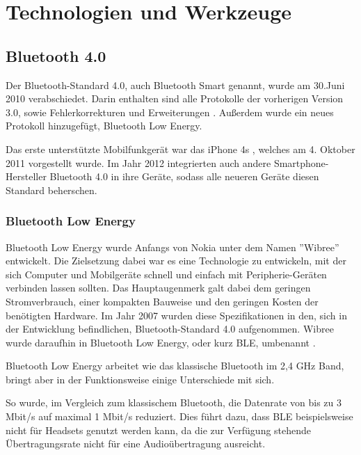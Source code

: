 \chapter{Technologien und Werkzeuge}
\label{chap:technologies}

\section{Bluetooth 4.0}
\label{sec:technologies:bluetooth4}

Der Bluetooth-Standard 4.0, auch Bluetooth Smart genannt, wurde am 30.Juni 2010 verabschiedet. Darin enthalten sind alle Protokolle der vorherigen Version 3.0, sowie Fehlerkorrekturen und Erweiterungen \cite{bluetoothcore}. Außerdem wurde ein neues Protokoll hinzugefügt, Bluetooth Low Energy. 

Das erste unterstützte Mobilfunkgerät war das iPhone 4s \cite{iphone4sspecs}, welches am 4. Oktober 2011 vorgestellt wurde. Im Jahr 2012 integrierten auch andere Smartphone-Hersteller Bluetooth 4.0 in ihre Geräte, sodass alle neueren Geräte diesen Standard beherschen.


\subsection{Bluetooth Low Energy}
\label{sec:technologies:bluetoothLE}

Bluetooth Low Energy wurde Anfangs von Nokia unter dem Namen ''Wibree'' entwickelt. Die Zielsetzung dabei war es eine Technologie zu entwickeln, mit der sich Computer und Mobilgeräte schnell und einfach mit Peripherie-Geräten verbinden lassen sollten. Das Hauptaugenmerk galt dabei dem geringen Stromverbrauch, einer kompakten Bauweise und den geringen Kosten der benötigten Hardware.
Im Jahr 2007 wurden diese Spezifikationen in den, sich in der Entwicklung befindlichen, Bluetooth-Standard 4.0 aufgenommen. Wibree wurde daraufhin in Bluetooth Low Energy, oder kurz BLE, umbenannt \cite{wibree}.

Bluetooth Low Energy arbeitet wie das klassische Bluetooth im 2,4 GHz Band, bringt aber in der Funktionsweise einige Unterschiede mit sich.

So wurde, im Vergleich zum klassischem Bluetooth, die Datenrate von bis zu 3 Mbit/s auf maximal 1 Mbit/s reduziert. Dies führt dazu, dass BLE beispielsweise nicht für Headsets genutzt werden kann, da die zur Verfügung stehende Übertragungsrate nicht für eine Audioübertragung ausreicht.

